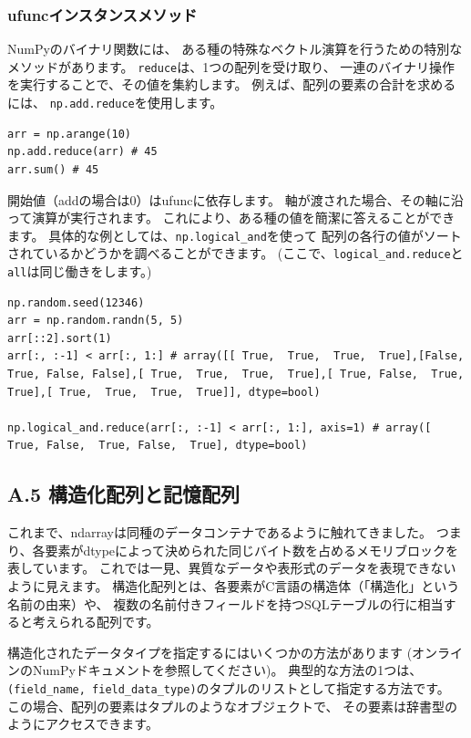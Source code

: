 \documentclass{jsarticle}
\begin{document}
        \subsubsection*{ufuncインスタンスメソッド}
            NumPyのバイナリ関数には、
            ある種の特殊なベクトル演算を行うための特別なメソッドがあります。
            \verb|reduce|は、1つの配列を受け取り、
            一連のバイナリ操作を実行することで、その値を集約します。
            例えば、配列の要素の合計を求めるには、
            \verb|np.add.reduce|を使用します。

            \begin{lstlisting}
arr = np.arange(10)
np.add.reduce(arr) # 45
arr.sum() # 45  
\end{lstlisting}

            開始値（addの場合は0）はufuncに依存します。
            軸が渡された場合、その軸に沿って演算が実行されます。
            これにより、ある種の値を簡潔に答えることができます。
            具体的な例としては、\verb|np.logical_and|を使って
            配列の各行の値がソートされているかどうかを調べることができます。
            (ここで、\verb|logical_and.reduce|と\verb|all|は同じ働きをします。)

            \begin{lstlisting}
np.random.seed(12346)
arr = np.random.randn(5, 5)
arr[::2].sort(1)
arr[:, :-1] < arr[:, 1:] # array([[ True,  True,  True,  True],[False,  True, False, False],[ True,  True,  True,  True],[ True, False,  True,  True],[ True,  True,  True,  True]], dtype=bool)

np.logical_and.reduce(arr[:, :-1] < arr[:, 1:], axis=1) # array([ True, False,  True, False,  True], dtype=bool)\end{lstlisting}

    \subsection*{A.5 構造化配列と記憶配列}
        これまで、ndarrayは同種のデータコンテナであるように触れてきました。
        つまり、各要素がdtypeによって決められた同じバイト数を占めるメモリブロックを表しています。
        これでは一見、異質なデータや表形式のデータを表現できないように見えます。
        構造化配列とは、各要素がC言語の構造体（「構造化」という名前の由来）や、
        複数の名前付きフィールドを持つSQLテーブルの行に相当すると考えられる配列です。

        構造化されたデータタイプを指定するにはいくつかの方法があります
        (オンラインのNumPyドキュメントを参照してください)。
        典型的な方法の1つは、
        \verb|(field_name, field_data_type)|のタプルのリストとして指定する方法です。
        この場合、配列の要素はタプルのようなオブジェクトで、
        その要素は辞書型のようにアクセスできます。
\end{document}
